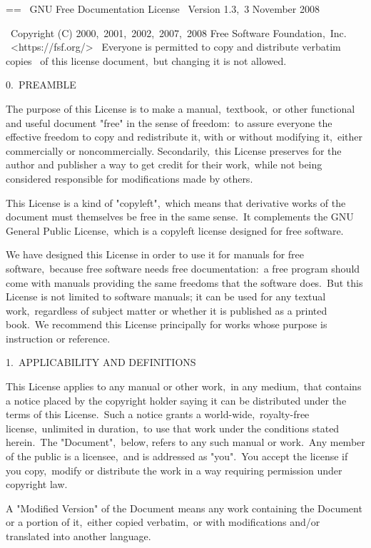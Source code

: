 \documentclass{book}
\makeatletter
\newenvironment{Texinfopreformatted}{%
  \par\GNUTobeylines\obeyspaces\frenchspacing\parskip=\z@\parindent=\z@}{}
{\catcode`\^^M=13 \gdef\GNUTobeylines{\catcode`\^^M=13 \def^^M{\null\par}}}
\newenvironment{Texinfoindented}{\begin{list}{}{}\item\relax}{\end{list}}
\renewcommand{\_}{\Texinfounderscore\discretionary{}{}{}}
\makeatother
\begin{document}
\begin{Texinfoindented}
\begin{Texinfopreformatted}%
\ttfamily 
\                GNU Free Documentation License
\                 Version 1.3,\ 3 November 2008


\ Copyright (C) 2000,\ 2001,\ 2002,\ 2007,\ 2008 Free Software Foundation,\ Inc.
\     <https://fsf.org/>
\ Everyone is permitted to copy and distribute verbatim copies
\ of this license document,\ but changing it is not allowed.

0.\ PREAMBLE

The purpose of this License is to make a manual,\ textbook,\ or other
functional and useful document "free" in the sense of freedom:\ to
assure everyone the effective freedom to copy and redistribute it,
with or without modifying it,\ either commercially or noncommercially.
Secondarily,\ this License preserves for the author and publisher a way
to get credit for their work,\ while not being considered responsible
for modifications made by others.

This License is a kind of "copyleft",\ which means that derivative
works of the document must themselves be free in the same sense.\  It
complements the GNU General Public License,\ which is a copyleft
license designed for free software.

We have designed this License in order to use it for manuals for free
software,\ because free software needs free documentation:\ a free
program should come with manuals providing the same freedoms that the
software does.\  But this License is not limited to software manuals;
it can be used for any textual work,\ regardless of subject matter or
whether it is published as a printed book.\  We recommend this License
principally for works whose purpose is instruction or reference.


1.\ APPLICABILITY AND DEFINITIONS

This License applies to any manual or other work,\ in any medium,\ that
contains a notice placed by the copyright holder saying it can be
distributed under the terms of this License.\  Such a notice grants a
world-wide,\ royalty-free license,\ unlimited in duration,\ to use that
work under the conditions stated herein.\  The "Document",\ below,
refers to any such manual or work.\  Any member of the public is a
licensee,\ and is addressed as "you".\  You accept the license if you
copy,\ modify or distribute the work in a way requiring permission
under copyright law.

A "Modified Version" of the Document means any work containing the
Document or a portion of it,\ either copied verbatim,\ or with
modifications and/or translated into another language.


\end{Texinfopreformatted}
\end{Texinfoindented}
\end{document}
